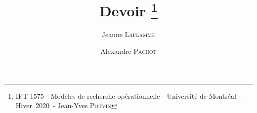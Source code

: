 \documentclass[10pt,twocolumn]{article}
\title{Devoir \no 2\thanks{IFT 1575 - Modèles de recherche opérationnelle - Université de Montréal - Hiver~2020~- Jean-Yves \textsc{Potvin}}}
\author{Jeanne \textsc{Laflamme} \and Alexandre \textsc{Pachot}}
\begin{document}
	
	\maketitle
	\renewcommand{\contentsname}{}
	\tableofcontents
	
	
	
	
	
	
	
\end{document}
